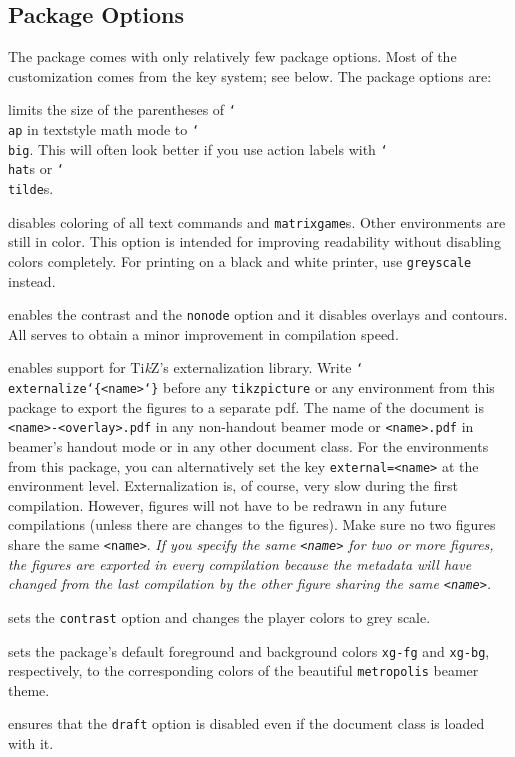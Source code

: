 \documentclass{article}
\newenvironment{desc}{\itemize[leftmargin=50pt]}{\enditemize}
\def\noption#1{\item[\texttt{#1}]}
\renewcommand{\textbackslash}{\char`\\}
\def\cmd#1{\texttt{\color{cmd}\textbackslash#1}}
\def\leftbrace{\char`\{}
\def\rightbrace{\char`\}}
\def\arg#1{{\color{cmd}\leftbrace}{\color{black}#1}{\color{cmd}\rightbrace}}
\def\TikZ{Ti\emph{k}Z\xspace}
\begin{document}
\subsection{Package Options}

The package comes with only relatively few package options. Most of the customization comes from the key system; see below. The package options are:

\begin{desc}
\noption{ap} limits the size of the parentheses of \cmd{ap} in textstyle math mode to \cmd{big}. This will often look better if you use action labels with \cmd{hat}s or \cmd{tilde}s. %
\noption{contrast} disables coloring of all text commands and \texttt{matrixgame}s. Other environments are still in color. This option is intended for improving readability without disabling colors completely. For printing on a black and white printer, use \texttt{greyscale} instead.
\noption{draft} enables the contrast and the \texttt{nonode} option and it disables overlays and contours. All serves to obtain a minor improvement in compilation speed.
\noption{external} enables support for \TikZ's externalization library. Write \cmd{externalize\arg{<name>}} before any \texttt{tikzpicture} or any environment from this package to export the figures to a separate pdf. The name of the document is \texttt{<name>-<overlay>.pdf} in any non-handout beamer mode or \texttt{<name>.pdf} in beamer's handout mode or in any other document class. For the environments from this package, you can alternatively set the key \texttt{external=<name>} at the environment level. Externalization is, of course, very slow during the first compilation. However, figures will not have to be redrawn in any future compilations (unless there are changes to the figures). Make sure no two figures share the same \texttt{<name>}. \emph{If you specify the same \texttt{<name>} for two or more figures, the figures are exported in every compilation because the metadata will have changed from the last compilation by the other figure sharing the same \texttt{<name>}.}%
\noption{greyscale} sets the \texttt{contrast} option and changes the player colors to grey scale.
\noption{metropolis} sets the package's default foreground and background colors \texttt{xg-fg} and \texttt{xg-bg}, respectively, to the corresponding colors of the beautiful \texttt{metropolis} beamer theme.
\noption{nodraft} ensures that the \texttt{draft} option is disabled even if the document class is loaded with it.

\end{desc}
\end{document}
